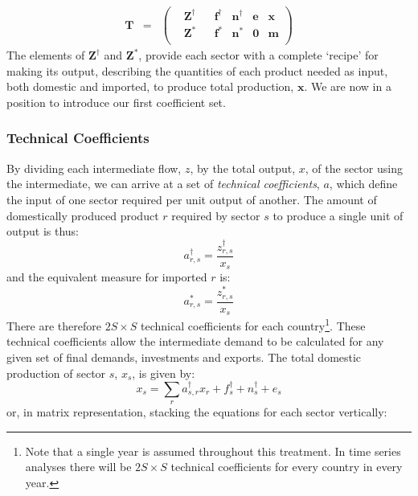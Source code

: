 \documentclass{article}
\begin{document}
\begin{equation}\label{eqn:Tvectorised}
\begin{array}{rcc}
\boldsymbol{T} & = & 
\left(
	\begin{array}{ccccccc}
 & \boldsymbol{Z}^{\dag} & & \boldsymbol{f}^\dag & \boldsymbol{n}^\dag & \boldsymbol{e} & \boldsymbol{x} \\
 & \boldsymbol{Z}^* & & \boldsymbol{f}^* & \boldsymbol{n}^* & \boldsymbol{0} & \boldsymbol{m} \\
	\end{array} 
\right)
\end{array}
\end{equation}
The elements of $\boldsymbol{Z}^\dagger$ and $\boldsymbol{Z}^*$, provide each sector with a complete `recipe' for making its output, describing the quantities of each product needed as input, both domestic and imported, to produce total production, $\boldsymbol{x}$. 
We are now in a position to introduce our first coefficient set.

\subsubsection*{Technical Coefficients}\label{sec:techcoeffs}
By dividing each intermediate flow, $z$, by the total output, $x$, of the sector using the intermediate, we can arrive at a set of \textit{technical coefficients}, $a$, which define the input of one sector required per unit output of another.
The amount of domestically produced product $r$ required by sector $s$ to produce a single unit of output is thus:
\begin{equation}\label{eq:adagger}
a_{r,s}^\dagger = \frac{z^\dagger_{r,s}}{x_s}
\end{equation}
and the equivalent measure for imported $r$ is:
\begin{equation}\label{eq:astar}
a_{r,s}^* = \frac{z^*_{r,s}}{x_s}
\end{equation}
There are therefore $2S \times S$ technical coefficients for each country\footnote{Note that a single year is assumed throughout this treatment.
In time series analyses there will be $2S \times S$ technical coefficients for every country in every year.}.
These technical coefficients allow the intermediate demand to be calculated for any given set of final demands, investments and exports. The total domestic production of sector $s$, $x_s$, is given by:
$$
x_s = \sum_r{a^\dagger_{s,r}x_r} + f^\dagger_s + n^\dagger_s + e_s 
$$
or, in matrix representation, stacking the equations for each sector vertically:
\end{document}
